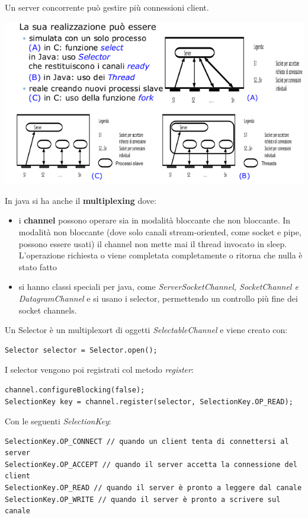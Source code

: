 \message{ !name(sd.tex)}\documentclass[a4paper,12pt, oneside]{book}
\begin{document}
Un server concorrente può gestire più connessioni client.
\begin{center}
	\includegraphics[scale=2.7]{img/conc.png}
\end{center}
In java si ha anche il \textbf{multiplexing} dove:
\begin{itemize}
	\item i \textbf{channel} possono operare sia in modalità bloccante che non bloccante. In modalità non bloccante (dove solo canali stream-oriented, come socket e pipe, possono essere usati) il channel non mette mai il thread invocato in sleep. L'operazione richiesta o viene completata completamente o ritorna che nulla è stato fatto
	\item si hanno classi speciali per java, come \textit{ServerSocketChannel, SocketChannel e
		      DatagramChannel} e si usano i selector, permettendo un controllo più fine dei socket channels.
\end{itemize}
Un Selector è un multiplexort di oggetti \textit{SelectableChannel} e viene creato con:
\begin{verbatim}
Selector selector = Selector.open();
\end{verbatim}
I selector vengono poi registrati col metodo \textit{register}:
\begin{verbatim}
channel.configureBlocking(false);
SelectionKey key = channel.register(selector, SelectionKey.OP_READ);
\end{verbatim}
Con le seguenti \textit{SelectionKey}:
\begin{verbatim}
SelectionKey.OP_CONNECT // quando un client tenta di connettersi al server
SelectionKey.OP_ACCEPT // quando il server accetta la connessione del client
SelectionKey.OP_READ // quando il server è pronto a leggere dal canale
SelectionKey.OP_WRITE // quando il server è pronto a scrivere sul canale
\end{verbatim}
\end{document}
